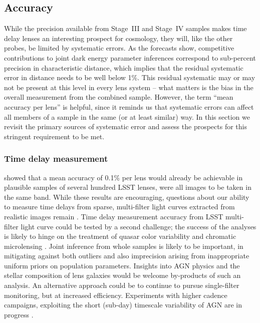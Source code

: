 \subsection{Accuracy}
\label{ssec:accuracy}

While the precision available from Stage~III and Stage~IV samples
makes time delay lenses an interesting prospect for cosmology, they
will, like the other probes, be limited by systematic errors. As the
forecasts show, competitive contributions to joint dark energy
parameter inferences correspond to sub-percent precision in
characteristic distance, which implies that the residual systematic
error in distance needs to be well below 1\%. This residual systematic
may or may not be present at this level in every lens system -- what
matters is the bias in the overall measurement from the combined
sample. However, the term ``mean accuracy per lens'' is helpful, since
it reminds us that systematic errors can affect all members of a
sample in the same (or at least similar) way.  In this section we
revisit the primary sources of systematic error and assess the
prospects for this stringent requirement to be met.

\subsubsection{Time delay measurement}

\citet{LiaoEtal2015} showed that a
mean accuracy of 0.1\% per lens would already be achievable in
plausible samples of several hundred LSST lenses, were all images to
be taken in the same band.  While these results are encouraging,
questions about our ability to measure time delays from sparse,
multi-filter light curves extracted from realistic images remain
\citep{TCM13}.  Time delay measurement accuracy from LSST multi-filter
light curve could be tested by a second challenge; the success of the
analyses is likely to hinge on the treatment of quasar color
variability \citep[see e.g.\ ][and references
therein]{Sch++12,SunEtal2014} and chromatic microlensing
\citep[see e.g.][and references therein]{HainlineEtal2013}.
Joint inference from whole samples is likely to
be important, in mitigating against both outliers and also imprecision
arising from inappropriate uniform priors on  population parameters.
Insights into AGN physics and the stellar composition  of lens galaxies
would be welcome by-products of such an analysis. An alternative approach
could be to continue to pursue single-filter monitoring, but at
increased efficiency. Experiments with higher cadence campaigns,
exploiting the short (sub-day) timescale variability of AGN are in
progress \citep[][F.~Courbin, priv.\ comm.]{BorosonEtal2016}.

